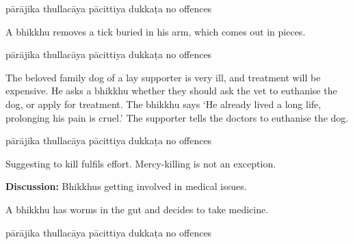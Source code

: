 \begin{exam}{\autoExamName}
\begin{problem*}
\begin{parts}
  \begin{answers}{5}
    \bChoices
     pārājika\eAns
     thullacāya\eAns
     pācittiya\eAns
     dukkaṭa\eAns
     no offences\eAns
    \eChoices
  \end{answers}

  \bigskip

  \item A bhikkhu removes a tick buried in his arm, which comes out in pieces.

  \bigskip

  \begin{answers}{5}
    \bChoices
     pārājika\eAns
     thullacāya\eAns
     pācittiya\eAns
     dukkaṭa\eAns
     no offences\eAns
    \eChoices
  \end{answers}

  \bigskip

  \item The beloved family dog of a lay supporter is very ill, and treatment will
    be expensive. He asks a bhikkhu whether they should ask the vet to euthanise
    the dog, or apply for treatment. The bhikkhu says `He already lived a long
    life, prolonging his pain is cruel.' The supporter tells the doctors to
    euthanise the dog.

  \bigskip

  \begin{answers}{5}
    \bChoices
     pārājika\eAns
     thullacāya\eAns
     pācittiya\eAns
     dukkaṭa\eAns
     no offences\eAns
    \eChoices
  \end{answers}

  \begin{solution}
    Suggesting to kill fulfils effort. Mercy-killing is not an exception.
  \end{solution}

  \bigskip

  \textbf{Discussion:} Bhikkhus getting involved in medical issues.  

  \bigskip
  
  \item A bhikkhu has worms in the gut and decides to take medicine.

  \bigskip

  \begin{answers}{5}
    \bChoices
     pārājika\eAns
     thullacāya\eAns
     pācittiya\eAns
     dukkaṭa\eAns
     no offences\eAns
    \eChoices
  \end{answers}


\end{parts}
\end{problem*}
\end{exam}
